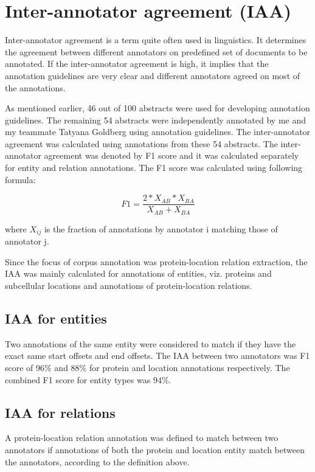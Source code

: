 \section{Inter-annotator agreement (IAA)}

Inter-annotator agreement is a term quite often used in linguistics. It determines the agreement between different annotators on predefined set of documents to be annotated. If the inter-annotator agreement is high, it implies that the annotation guidelines are very clear and different annotators agreed on most of the annotations.

As mentioned earlier, 46 out of 100 abstracts were used for developing annotation guidelines. The remaining 54 abstracts were independently annotated by me and my teammate Tatyana Goldberg using annotation guidelines. The inter-annotator agreement was calculated using annotations from these 54 abstracts. The inter-annotator agreement was denoted by F1 score and it was calculated separately for entity and relation annotations. The F1 score was calculated using following formula:

$$
F1 = \frac{2*X_{AB}*X_{BA}}{X_{AB}+X_{BA}}
$$

where $X_{ij}$ is the fraction of annotations by annotator i matching those of annotator j.

Since the focus of corpus annotation was protein-location relation extraction, the IAA was mainly calculated for annotations of entities, viz. proteins and subcellular locations and annotations of protein-location relations.

\subsection*{IAA for entities}

Two annotations of the same entity were considered to match if they have the exact same start offsets and end offsets. The IAA between two annotators was F1 score of  96\% and 88\% for protein and location annotations respectively. The combined F1 score for entity types was 94\%.

\subsection*{IAA for relations}

A protein-location relation annotation was defined to match between two annotators if annotations of both the protein and location entity match between the annotators, according to the definition above.

